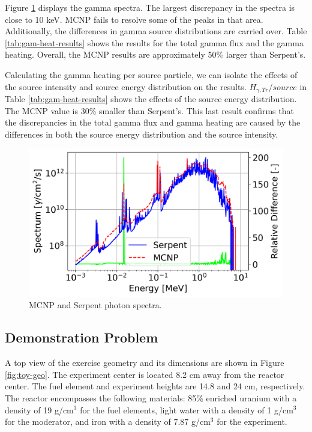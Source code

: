 Figure \ref{fig:g-spectra} displays the gamma spectra.
The largest discrepancy in the spectra is close to 10 keV.
MCNP fails to resolve some of the peaks in that area.
Additionally, the differences in gamma source distributions are carried over. 
Table \ref{tab:gam-heat-results} shows the results for the total gamma flux and the gamma heating.
Overall, the MCNP results are approximately 50\% larger than Serpent's.

Calculating the gamma heating per source particle, we can isolate the effects of the source intensity and source energy distribution on the results.
$H_{\gamma, Tr}/source$ in Table \ref{tab:gam-heat-results} shows the effects of the source energy distribution.
The MCNP value is 30\% smaller than Serpent's.
This last result confirms that the discrepancies in the total gamma flux and gamma heating are caused by the differences in both the source energy distribution and the source intensity.

\begin{figure}[htbp!] %
    \centering
    \includegraphics[width=0.65\linewidth]{figures/g-spect.png}
    \hfill
    \caption{MCNP and Serpent photon spectra.}
    \label{fig:g-spectra}
\end{figure}


\subsection{Demonstration Problem}
\label{sec:demo}

A top view of the exercise geometry and its dimensions are shown in Figure \ref{fig:toy-geo}.
The experiment center is located 8.2 cm away from the reactor center.
The fuel element and experiment heights are 14.8 and 24 cm, respectively.
The reactor encompasses the following materials: 85\% enriched uranium with a density of 19 g/cm$^3$ for the fuel elements, light water with a density of 1 g/cm$^3$ for the moderator, and iron with a density of 7.87 g/cm$^3$ for the experiment.

